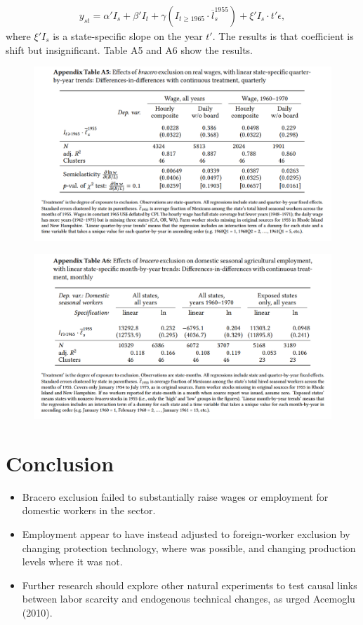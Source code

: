 \documentclass[../root]{subfiles}
\begin{document}
    \begin{align*}
         y_{st}= \alpha' I_s + \beta'I_t +\gamma(I_{t \geq 1965} \cdot \overline{l}^{1955}_s) +\xi'I_s \cdot t' \epsilon,
    \end{align*}
    where $\xi'I_s$ is a state-specific slope on the year $t'$.
    The results is that coefficient is shift but insignificant. Table A5 and A6 show the results.
    \begin{figure}
        \centering
        \includegraphics[width = \linewidth]{0731sugiyama/TableA5.png}
        \label{fig:my_label}
    \end{figure}
    \begin{figure}
        \centering
        \includegraphics[width = \linewidth]{0731sugiyama/TableA6.png} 
        \label{fig:my_label}
    \end{figure}
    \section{Conclusion}
    \begin{itemize}
        \item Bracero exclusion failed to substantially raise wages or employment for domestic workers in the sector.
        \item Employment appear to have instead adjusted to foreign-worker exclusion by changing protection technology, where was possible, and changing production levels where it was not.
        \item Further research should explore other natural experiments to test causal links between labor scarcity and endogenous technical changes, as urged Acemoglu (2010).  
    \end{itemize}
      
    
    
    \biblio
    
\end{document}
